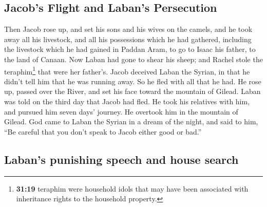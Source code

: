 \begin{paracol}{2}
\begin{otherlanguage}{english}
\hypertarget{jacobs-flight-and-labans-persecution}{%
\subsection{Jacob's Flight and Laban's
Persecution}\label{jacobs-flight-and-labans-persecution}}

 Then Jacob rose up, and set his sons and his wives on
the camels,  and he took away all his livestock, and all
his possessions which he had gathered, including the livestock which he
had gained in Paddan Aram, to go to Isaac his father, to the land of
Canaan.  Now Laban had gone to shear his sheep; and
Rachel stole the teraphim\footnote{\textbf{31:19} teraphim were
  household idols that may have been associated with inheritance rights
  to the household property.} that were her father's. 
Jacob deceived Laban the Syrian, in that he didn't tell him that he was
running away.  So he fled with all that he had. He rose
up, passed over the River, and set his face toward the mountain of
Gilead.  Laban was told on the third day that Jacob had
fled.  He took his relatives with him, and pursued him
seven days' journey. He overtook him in the mountain of Gilead.
 God came to Laban the Syrian in a dream of the night,
and said to him, ``Be careful that you don't speak to Jacob either good
or bad.''

\hypertarget{labans-punishing-speech-and-house-search}{%
\subsection{Laban's punishing speech and house
search}\label{labans-punishing-speech-and-house-search}}


\end{otherlanguage}
\end{paracol}
